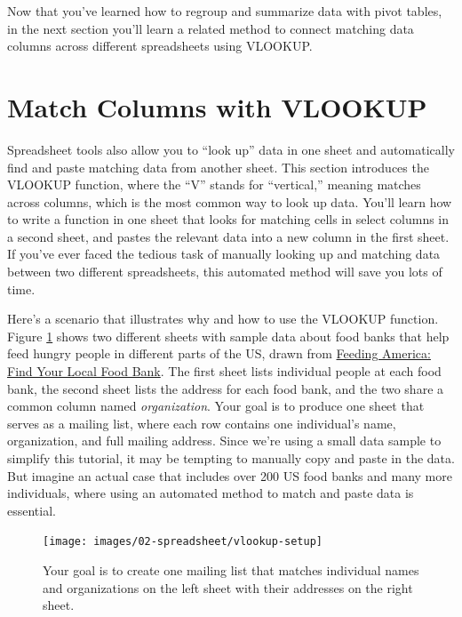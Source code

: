 \documentclass[
  english,
]{book}
\begin{document}
Now that you've learned how to regroup and summarize data with pivot tables, in the next section you'll learn a related method to connect matching data columns across different spreadsheets using VLOOKUP.

\hypertarget{vlookup}{%
\section*{Match Columns with VLOOKUP}\label{vlookup}}

Spreadsheet tools also allow you to ``look up'' data in one sheet and automatically find and paste matching data from another sheet. This section introduces the VLOOKUP function, where the ``V'' stands for ``vertical,'' meaning matches across columns, which is the most common way to look up data. You'll learn how to write a function in one sheet that looks for matching cells in select columns in a second sheet, and pastes the relevant data into a new column in the first sheet. If you've ever faced the tedious task of manually looking up and matching data between two different spreadsheets, this automated method will save you lots of time.

Here's a scenario that illustrates why and how to use the VLOOKUP function. Figure \ref{fig:vlookup-setup} shows two different sheets with sample data about food banks that help feed hungry people in different parts of the US, drawn from \href{https://www.feedingamerica.org/find-your-local-foodbank}{Feeding America: Find Your Local Food Bank}. The first sheet lists individual people at each food bank, the second sheet lists the address for each food bank, and the two share a common column named \emph{organization}. Your goal is to produce one sheet that serves as a mailing list, where each row contains one individual's name, organization, and full mailing address. Since we're using a small data sample to simplify this tutorial, it may be tempting to manually copy and paste in the data. But imagine an actual case that includes over 200 US food banks and many more individuals, where using an automated method to match and paste data is essential.



\begin{figure}
\texttt{[image: images/02-spreadsheet/vlookup-setup]} \caption{Your goal is to create one mailing list that matches individual names and organizations on the left sheet with their addresses on the right sheet.}\label{fig:vlookup-setup}
\end{figure}
\end{document}
